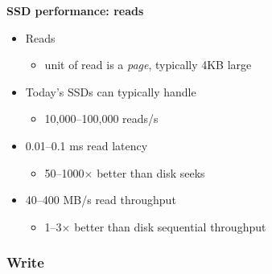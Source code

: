 \documentclass[11pt,a4paper]{article}
\begin{document}
\textbf{SSD performance: reads}
\begin{itemize}
    \item Reads
        \begin{itemize}
            \item unit of read is a \emph{page}, typically 4KB large
        \end{itemize}
    \item Today's SSDs can typically handle
        \begin{itemize}
            \item 10,000--100,000 reads/s
        \end{itemize}
    \item 0.01--0.1 ms read latency
        \begin{itemize}
            \item 50--1000$\times$ better than disk seeks
        \end{itemize}
    \item 40--400 MB/s read throughput \begin{itemize}
            \item 1--3$\times$ better than disk sequential throughput
        \end{itemize}
\end{itemize}

\subsubsection{Write}
\end{document}
